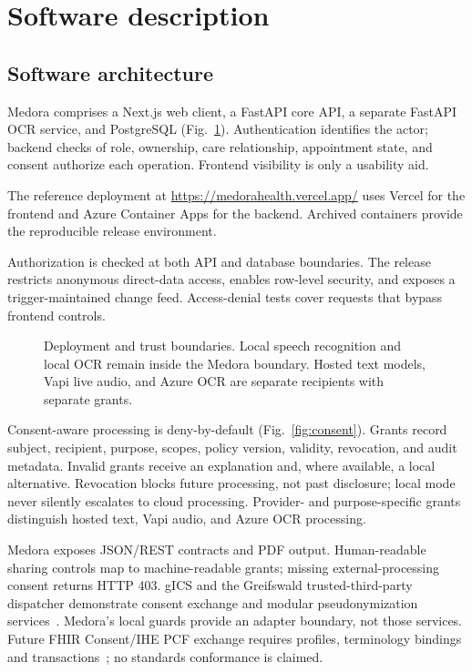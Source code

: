 \documentclass[preprint,12pt,a4paper]{elsarticle}
\begin{document}
\section{Software description}

\subsection{Software architecture}

Medora comprises a Next.js web client, a FastAPI core API, a separate FastAPI OCR service,
and PostgreSQL (Fig.~\ref{fig:trust}). Authentication identifies the actor; backend checks
of role, ownership, care relationship, appointment state, and consent authorize each
operation. Frontend visibility is only a usability aid.

The reference deployment at \url{https://medorahealth.vercel.app/} uses Vercel for the
frontend and Azure Container Apps for the backend. Archived containers provide the
reproducible release environment.

Authorization is checked at both API and database boundaries. The release restricts
anonymous direct-data access, enables row-level security, and exposes a trigger-maintained
change feed. Access-denial tests cover requests that bypass frontend controls.

\begin{figure}[!htbp]
\centering\resizebox{\textwidth}{!}{}
\caption{Deployment and trust boundaries. Local speech recognition and local OCR remain
inside the Medora boundary. Hosted text models, Vapi live audio, and Azure OCR are separate
recipients with separate grants.}
\label{fig:trust}
\end{figure}

Consent-aware processing is deny-by-default (Fig.~\ref{fig:consent}). Grants record subject,
recipient, purpose, scopes, policy version, validity, revocation, and audit metadata. Invalid
grants receive an explanation and, where available, a local alternative. Revocation blocks
future processing, not past disclosure; local mode never silently escalates to cloud processing. Provider-
and purpose-specific grants distinguish hosted text, Vapi audio, and Azure OCR processing.

Medora exposes JSON/REST contracts and PDF output. Human-readable sharing controls map
to machine-readable grants; missing external-processing consent returns HTTP 403.
gICS and the Greifswald trusted-third-party dispatcher demonstrate consent exchange and
modular pseudonymization services~\cite{gics2022,ttp2024}. Medora's local guards provide an
adapter boundary, not those services. Future FHIR Consent/IHE PCF exchange requires profiles,
terminology bindings and transactions~\cite{fhirconsent,ihepcf,consent2025}; no standards
conformance is claimed.
\end{document}

